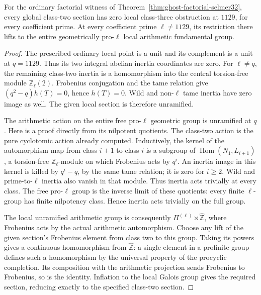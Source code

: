 \begin{proposition}
\label{prop:ghost-1129-unramified}
For the ordinary factorial witness of
Theorem~\ref{thm:ghost-factorial-selmer32}, every global
class-two section has zero local class-three obstruction
at \(1129\), for every coefficient prime.
At every coefficient prime \(\ell\ne1129\), its
restriction there lifts to the entire geometrically
pro-\(\ell\) local arithmetic fundamental group.
\end{proposition}
\begin{proof}
The prescribed ordinary local point is a unit and its
complement is a unit at \(q=1129\). Thus its two
integral abelian inertia coordinates are zero. For
\(\ell\ne q\), the remaining class-two inertia is a
homomorphism into the central torsion-free module
\(\mathbb Z_\ell(2)\). Frobenius conjugation and the
tame relation give \((q^2-q)h(T)=0\), hence \(h(T)=0\).
Wild and non-\(\ell\) tame inertia have zero image as
well. The given local section is therefore unramified.

The arithmetic action on the entire free pro-\(\ell\)
geometric group is unramified at \(q\). Here is a
proof directly from its nilpotent quotients. The
class-two action is the pure cyclotomic action already
computed. Inductively, the kernel of the automorphism
map from class \(i+1\) to class \(i\) is a subgroup
of \(\operatorname{Hom}(N_1,L_{i+1})\), a torsion-free
\(\mathbb Z_\ell\)-module on which Frobenius acts by
\(q^i\). An inertia image in this kernel is killed by
\(q^i-q\), by the same tame relation; it is zero for
\(i\ge2\). Wild and prime-to-\(\ell\) inertia also
vanish in that module. Thus inertia acts trivially at
every class. The free pro-\(\ell\) group is the inverse
limit of these quotients: every finite \(\ell\)-group
has finite nilpotency class. Hence inertia acts trivially
on the full group.

The local unramified arithmetic group is consequently
\(\Pi^{(\ell)}\rtimes\widehat{\mathbb Z}\), where
Frobenius acts by the actual arithmetic automorphism.
Choose any lift of the given section's Frobenius element
from class two to this group. Taking its powers gives
a continuous homomorphism from
\(\widehat{\mathbb Z}\): a single element in a profinite
group defines such a homomorphism by the universal
property of the procyclic completion. Its composition
with the arithmetic projection sends Frobenius to
Frobenius, so is the identity. Inflation to the local
Galois group gives the required section, reducing
exactly to the specified class-two section.


\end{proof}
